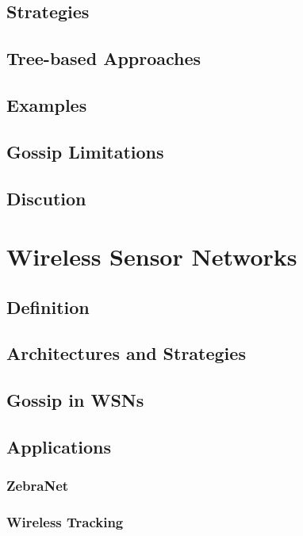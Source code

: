 \subsection{Strategies}

\subsection{Tree-based Approaches}

\subsection{Examples}

\subsection{Gossip Limitations}

\subsection{Discution}

\section{Wireless Sensor Networks}
\label{sec:wireless_sensor_networks}

\subsection{Definition}

\subsection{Architectures and Strategies}

\subsection{Gossip in WSNs}

\subsection{Applications}
\subsubsection{ZebraNet}
\subsubsection{Wireless Tracking}

